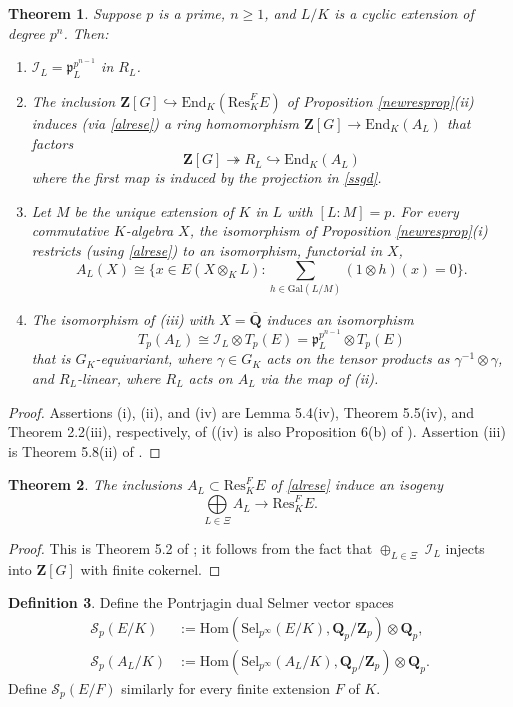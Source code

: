 \documentclass[reqno]{amsart}
\newtheorem{thm}{Theorem}[section]
\theoremstyle{definition}
\newtheorem{defn}[thm]{Definition}
\def\Z{\mathbf{Z}}
\def\Q{\mathbf{Q}}
\def\Zp{\Z_p}
\def\Qp{\Q_p}
\def\cS{\mathcal{S}}
\def\I{\mathcal{I}}
\def\P{\mathfrak{p}}
\def\Hom{\mathrm{Hom}}
\def\Gal{\mathrm{Gal}}
\def\Res{\mathrm{Res}}
\def\End{\mathrm{End}}
\def\too{\longrightarrow}
\def\Sel{\mathrm{Sel}}
\def\Scp{\cS_p}
\def\hookto{\hookrightarrow}
\def\onto{\twoheadrightarrow}
\def\dirsum#1{\underset{#1}{\textstyle\bigoplus}}
\def\alg{X}
\begin{document}
\begin{thm}
\label{athm}
Suppose $p$ is a prime, $n \ge 1$, and 
$L/K$ is a cyclic extension of degree $p^n$.  Then:
\begin{enumerate}
\item
$\I_L = \P_L^{p^{n-1}}$ in $R_L$.
\item
The inclusion 
$\Z[G] \hookto \End_K(\Res^F_K E)$ of Proposition \ref{newresprop}(ii)
induces (via \eqref{alrese}) a ring homomorphism $\Z[G] \to \End_K(A_L)$ 
that factors 
$$
\Z[G] \onto R_L \hookto \End_K(A_L)
$$
where the first map is induced by the projection in \eqref{ssgd}.
\item
Let $M$ be the unique extension of $K$ in $L$ with $[L:M] = p$.  
For every commutative $K$-algebra $\alg$, the isomorphism of 
Proposition \ref{newresprop}(i) restricts (using \eqref{alrese}) to an isomorphism, 
functorial in $\alg$, 
$$
A_L(\alg) \cong \{x \in E(\alg \otimes_K L) : 
    \sum_{h \in \Gal(L/M)}(1 \otimes h)(x) = 0\}.
$$
\item
The isomorphism of (iii) with $X = \bar{\Q}$ induces an isomorphism
$$
T_p(A_L) \cong \I_L \otimes T_p(E) = \P_L^{p^{n-1}} \otimes T_p(E)
$$
that is $G_K$-equivariant, where $\gamma \in G_K$ acts on 
the tensor products as $\gamma^{-1} \otimes \gamma$, 
and $R_L$-linear, where $R_L$ acts on $A_L$ via the map of (ii).
\end{enumerate}
\end{thm}

\begin{proof}
Assertions (i), (ii), and (iv) are Lemma 5.4(iv), Theorem 5.5(iv), 
and Theorem 2.2(iii), respectively, of \cite{prim} 
((iv) is also Proposition 6(b) of \cite{milne}).  
Assertion (iii) is Theorem 5.8(ii) of \cite{prim}.  
\end{proof}

\begin{thm}
\label{newdecomp}
The inclusions $A_L \subset \Res^F_K E$ of \eqref{alrese} induce an isogeny 
$$
\dirsum{L \in \Xi} A_L \too \Res^F_K E.
$$
\end{thm}

\begin{proof}
This is Theorem 5.2 of \cite{prim};  
it follows from the fact that $\oplus_{L \in \Xi} \;\I_L$ injects into 
$\Z[G]$ with finite cokernel.
\end{proof}

\begin{defn}
\label{scpdef}
Define the Pontrjagin dual Selmer vector spaces 
\begin{align*}
\Scp(E/K) &:= \Hom(\Sel_{p^\infty}(E/K),\Qp/\Zp) \otimes \Qp, \\
\Scp(A_L/K) &:= \Hom(\Sel_{p^\infty}(A_L/K),\Qp/\Zp) \otimes \Qp.
\end{align*}
Define $\Scp(E/F)$ similarly for every finite extension $F$ of $K$.
\end{defn}
\end{document}
